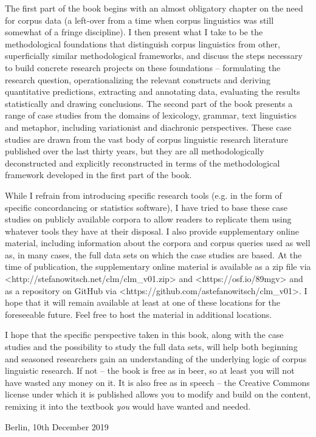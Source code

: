 The first part of the book begins with an almost obligatory chapter on the need for corpus data (a left\hyp{}over from a time when corpus linguistics was still somewhat of a fringe discipline). I then present what I take to be the methodological foundations that distinguish corpus linguistics from other, superficially similar methodological frameworks, and discuss the steps necessary to build concrete research projects on these foundations – formulating the research question, operationalizing the relevant constructs and deriving quantitative predictions, extracting and annotating data, evaluating the results statistically and drawing conclusions. The second part of the book presents a range of case studies from the domains of lexicology, grammar, text linguistics and metaphor, including variationist and diachronic perspectives. These case studies are drawn from the vast body of corpus linguistic research literature published over the last thirty years, but they are all methodologically deconstructed and explicitly reconstructed in terms of the methodological framework developed in the first part of the book.

While I refrain from introducing specific research tools (e.g. in the form of specific concordancing or statistics software), I have tried to base these case studies on publicly available corpora to allow readers to replicate them using whatever tools they have at their disposal. I also provide supplementary online material, including information about the corpora and corpus queries used as well as, in many cases, the full data sets on which the case studies are based. At the time of publication, the supplementary online material is available as a zip file via <http://stefanowitsch.net/clm/clm\_v01.zip> and <https://osf.io/89mgv> and as a repository on GitHub via <https://github.com/astefanowitsch/clm\_v01>. I hope that it will remain available at least at one of these locations for the foreseeable future. Feel free to host the material in additional locations.

I hope that the specific perspective taken in this book, along with the case studies and the possibility to study the full data sets, will help both beginning and seasoned researchers gain an understanding of the underlying logic of corpus linguistic research. If not -- the book is free as in beer, so at least you will not have wasted any money on it. It is also free as in speech -- the Creative Commons license under which it is published allows you to modify and build on the content, remixing it into the textbook \emph{you} would have wanted and needed.

\begin{flushright}
Berlin, 10th December 2019
\end{flushright}
 
